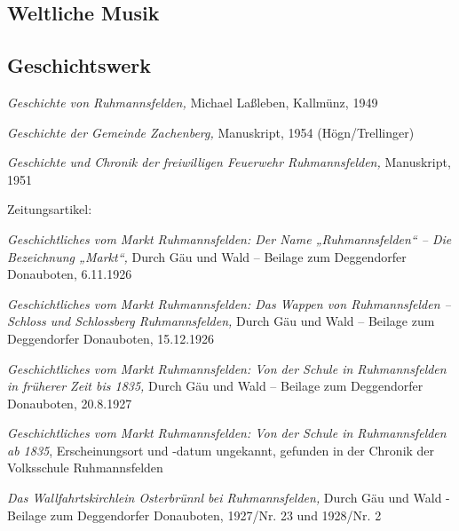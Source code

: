 \documentclass{book}
\begin{document}
\subsection{Weltliche Musik}


\subsection{Geschichtswerk}

\textit{Geschichte von Ruhmannsfelden,} Michael Laßleben, Kallmünz, 1949


\textit{Geschichte der Gemeinde Zachenberg,} Manuskript, 1954
(Högn/Trellinger)

\textit{Geschichte und Chronik der freiwilligen Feuerwehr
Ruhmannsfelden,} Manuskript, 1951 

Zeitungsartikel:

\textit{Geschichtliches vom Markt Ruhmannsfelden: Der Name
„Ruhmannsfelden“ – Die Bezeichnung „Markt“, }Durch Gäu und Wald –
Beilage zum Deggendorfer Donauboten, 6.11.1926

\textit{Geschichtliches vom Markt Ruhmannsfelden: Das Wappen von
Ruhmannsfelden – Schloss und Schlossberg Ruhmannsfelden, }Durch Gäu und
Wald – Beilage zum Deggendorfer Donauboten, 15.12.1926

\textit{Geschichtliches vom Markt Ruhmannsfelden: Von der Schule in
Ruhmannsfelden in früherer Zeit bis 1835,} Durch Gäu und Wald – Beilage
zum Deggendorfer Donauboten, 20.8.1927

\textit{Geschichtliches vom Markt Ruhmannsfelden: Von der Schule in
Ruhmannsfelden ab 1835}, Erscheinungsort und -datum ungekannt, gefunden
in der Chronik der Volksschule Ruhmannsfelden

\textit{Das Wallfahrtskirchlein Osterbrünnl bei Ruhmannsfelden,} Durch
Gäu und Wald - Beilage zum Deggendorfer Donauboten, 1927/Nr. 23  und 
1928/Nr. 2
\end{document}
